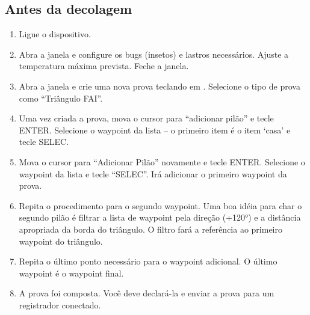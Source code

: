 \subsection*{Antes da decolagem}
\begin{enumerate}
\item  Ligue o dispositivo.
\item  Abra a janela  e configure os bugs (insetos) e lastros necessários.  Ajuste a temperatura máxima prevista.  Feche a janela.
\item  Abra a janela  e crie uma nova prova teclando em 
. Selecione o tipo de prova como “Triângulo FAI”.
\item  Uma vez criada a prova, mova o cursor para “adicionar pilão” e tecle ENTER.  Selecione o waypoint da lista – o primeiro item é o item ‘casa’ e tecle SELEC.  
\item  Mova o cursor para “Adicionar Pilão” novamente e tecle ENTER.  Selecione o waypoint da lista e tecle “SELEC”.  Irá adicionar o primeiro waypoint da prova.
\item  Repita o procedimento para o segundo waypoint.  Uma boa idéia para char o segundo pilão é filtrar a lista de waypoint pela direção (+120°) e a distância apropriada da borda do triângulo.  O filtro fará a referência ao primeiro waypoint do triângulo.
\item  Repita o último ponto necessário para o waypoint adicional.  O último waypoint é o waypoint final.
\item  A prova foi composta. Você deve declará-la e enviar a prova para um registrador conectado.  
\end{enumerate}

